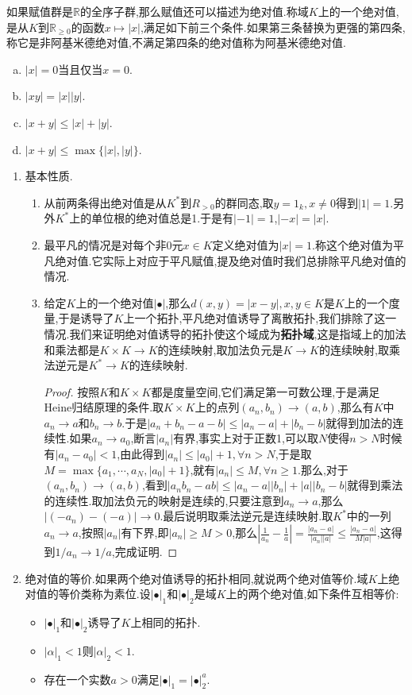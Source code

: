 如果赋值群是$\mathbb{R}$的全序子群,那么赋值还可以描述为绝对值.称域$K$上的一个绝对值,是从$K$到$\mathbb{R}_{\ge0}$的函数$x\mapsto|x|$,满足如下前三个条件.如果第三条替换为更强的第四条,称它是非阿基米德绝对值,不满足第四条的绝对值称为阿基米德绝对值.
\begin{enumerate}[(a)]
	\item $|x|=0$当且仅当$x=0$.
	\item $|xy|=|x||y|$.
	\item $|x+y|\le|x|+|y|$.
	\item $|x+y|\le\max\{|x|,|y|\}$.
\end{enumerate}
\begin{enumerate}
	\item 基本性质.
	\begin{enumerate}
		\item 从前两条得出绝对值是从$K^*$到$R_{>0}$的群同态,取$y=1_k,x\not=0$得到$|1|=1$.另外$K^*$上的单位根的绝对值总是1.于是有$|-1|=1$,$|-x|=|x|$.
		\item 最平凡的情况是对每个非0元$x\in K$定义绝对值为$|x|=1$.称这个绝对值为平凡绝对值.它实际上对应于平凡赋值,提及绝对值时我们总排除平凡绝对值的情况.
		\item 给定$K$上的一个绝对值$|\bullet|$,那么$d(x,y)=|x-y|,x,y\in K$是$K$上的一个度量,于是诱导了$K$上一个拓扑,平凡绝对值诱导了离散拓扑,我们排除了这一情况.我们来证明绝对值诱导的拓扑使这个域成为\textbf{拓扑域},这是指域上的加法和乘法都是$K\times K\to K$的连续映射,取加法负元是$K\to K$的连续映射,取乘法逆元是$K^*\to K$的连续映射.
		\begin{proof}
			
			按照$K$和$K\times K$都是度量空间,它们满足第一可数公理,于是满足Heine归结原理的条件.取$K\times K$上的点列$(a_n,b_n)\to (a,b)$,那么有$K$中$a_n\to a$和$b_n\to b$.于是$|a_n+b_n-a-b|\le|a_n-a|+|b_n-b|$就得到加法的连续性.如果$a_n\to a_0$,断言$|a_n|$有界,事实上对于正数1,可以取$N$使得$n>N$时候有$|a_n-a_0|<1$,由此得到$|a_n|\le|a_0|+1,\forall n>N$,于是取$M=\max\{a_1,\cdots,a_N,|a_0|+1\}$,就有$|a_n|\le M,\forall n\ge1$.那么,对于$(a_n,b_n)\to (a,b)$,看到$|a_nb_n-ab|\le|a_n-a||b_n|+|a||b_n-b|$就得到乘法的连续性.取加法负元的映射是连续的,只要注意到$a_n\to a$,那么$|(-a_n)-(-a)|\to0$.最后说明取乘法逆元是连续映射.取$K^*$中的一列$a_n\to a$,按照$|a_n|$有下界,即$|a_n|\ge M>0$,那么$|\frac{1}{a_n}-\frac{1}{a}|=\frac{|a_n-a|}{|a_n||a|}\le\frac{|a_n-a|}{M|a|}$,这得到$1/a_n\to1/a$,完成证明.
		\end{proof}
	\end{enumerate}
	\item 绝对值的等价.如果两个绝对值诱导的拓扑相同,就说两个绝对值等价.域$K$上绝对值的等价类称为素位.设$|\bullet|_1$和$|\bullet|_2$是域$K$上的两个绝对值,如下条件互相等价:
	\begin{itemize}
		\item $|\bullet|_1$和$|\bullet|_2$诱导了$K$上相同的拓扑.
		\item $|\alpha|_1<1$则$|\alpha|_2<1$.
		\item 存在一个实数$a>0$满足$|\bullet|_1=|\bullet|_2^a$.
	\end{itemize}


\end{enumerate}
